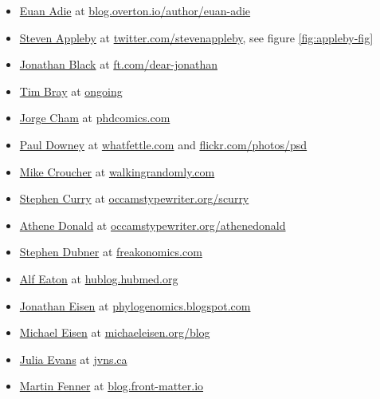 \documentclass[
]{book}
\providecommand{\tightlist}{%
  \setlength{\itemsep}{0pt}\setlength{\parskip}{0pt}}
\begin{document}
\begin{itemize}
\tightlist
\item
  \href{https://twitter.com/stew}{Euan Adie} at \href{https://blog.overton.io/author/euan-adie}{blog.overton.io/author/euan-adie}
\item
  \href{https://en.wikipedia.org/wiki/Steven_Appleby}{Steven Appleby} at \href{https://twitter.com/stevenappleby}{twitter.com/stevenappleby}, see figure \ref{fig:appleby-fig}
\item
  \href{https://www.new.ox.ac.uk/node/1003}{Jonathan Black} at \href{https://www.ft.com/dear-jonathan}{ft.com/dear-jonathan}
\item
  \href{https://en.wikipedia.org/wiki/Tim_Bray}{Tim Bray} at \href{https://www.tbray.org/ongoing/}{ongoing}
\item
  \href{https://en.wikipedia.org/wiki/Jorge_Cham}{Jorge Cham} at \href{https://phdcomics.com/}{phdcomics.com}
\item
  \href{https://twitter.com/psd}{Paul Downey} at \href{https://blog.whatfettle.com/}{whatfettle.com} and \href{https://www.flickr.com/photos/psd/}{flickr.com/photos/psd}
\item
  \href{https://twitter.com/walkingrandomly}{Mike Croucher} at \href{https://walkingrandomly.com/}{walkingrandomly.com}
\item
  \href{https://twitter.com/Stephen_Curry}{Stephen Curry} at \href{https://occamstypewriter.org/scurry}{occamstypewriter.org/scurry}
\item
  \href{https://en.wikipedia.org/wiki/Athene_Donald}{Athene Donald} at \href{http://occamstypewriter.org/athenedonald}{occamstypewriter.org/athenedonald}
\item
  \href{https://en.wikipedia.org/wiki/Stephen_J._Dubner}{Stephen Dubner} at \href{https://freakonomics.com/}{freakonomics.com}
\item
  \href{https://twitter.com/invisiblecomma}{Alf Eaton} at \href{https://hublog.hubmed.org/}{hublog.hubmed.org}
\item
  \href{https://en.wikipedia.org/wiki/Jonathan_Eisen}{Jonathan Eisen} at \href{https://phylogenomics.blogspot.com/}{phylogenomics.blogspot.com}
\item
  \href{https://en.wikipedia.org/wiki/Michael_Eisen}{Michael Eisen} at \href{https://www.michaeleisen.org/blog/}{michaeleisen.org/blog}
\item
  \href{https://twitter.com/b0rk}{Julia Evans} at \href{https://jvns.ca/}{jvns.ca}
\item
  \href{https://twitter.com/mfenner}{Martin Fenner} at \href{https://blog.front-matter.io/}{blog.front-matter.io}

\end{itemize}
\end{document}
